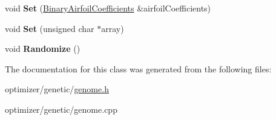 \begin{DoxyCompactItemize}
\item 
\hypertarget{class_genome_ad05f549a5fb6603245f6bbd303d60ec1}{}\label{class_genome_ad05f549a5fb6603245f6bbd303d60ec1} 
void {\bfseries Set} (\hyperlink{struct_binary_airfoil_coefficients}{Binary\+Airfoil\+Coefficients} \&airfoil\+Coefficients)
\item 
\hypertarget{class_genome_a390f17f811a33f34d7bcf4a61c3b9c5d}{}\label{class_genome_a390f17f811a33f34d7bcf4a61c3b9c5d} 
void {\bfseries Set} (unsigned char $\ast$array)
\item 
\hypertarget{class_genome_a4e942202f21f552157604cda9529e19d}{}\label{class_genome_a4e942202f21f552157604cda9529e19d} 
void {\bfseries Randomize} ()
\end{DoxyCompactItemize}


The documentation for this class was generated from the following files\+:\begin{DoxyCompactItemize}
\item 
optimizer/genetic/\hyperlink{genome_8h}{genome.\+h}\item 
optimizer/genetic/genome.\+cpp\end{DoxyCompactItemize}
